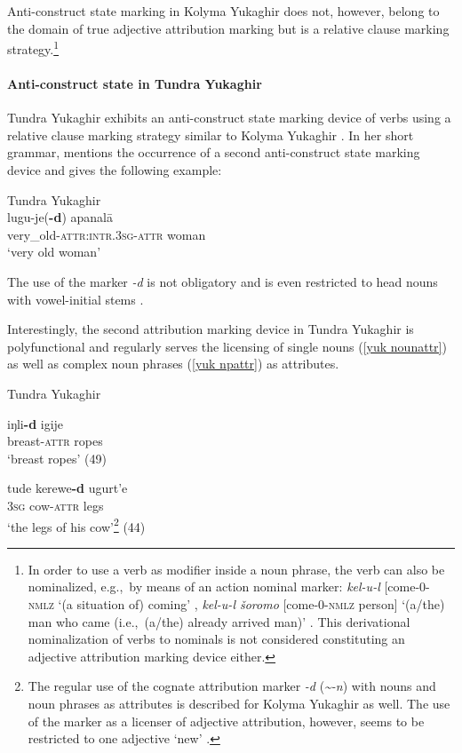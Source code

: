 Anti\hyp{}construct state marking in Kolyma Yukaghir does not, however, belong to the domain of true adjective attribution marking but is a relative clause marking strategy.\footnote{In order to use a verb as modifier inside a noun phrase, the verb can also be nominalized, e.g.,~by means of an action nominal marker: \textit{kel-u-l} [come-0-\textsc{nmlz} ‘(a situation of) coming’ \cite[147]{maslova2003b}, \textit{kel-u-l šoromo} [come-0-\textsc{nmlz} person] ‘(a/the) man who came (i.e.,~(a/the) already arrived man)’ \cite[67]{maslova2003b}. This derivational nominalization of verbs to nominals is not considered constituting an adjective attribution marking device either.}

\paragraph*{Anti\hyp{}construct state in Tundra Yukaghir}
Tundra Yukaghir exhibits an anti\hyp{}construct state marking device of verbs using a relative clause marking strategy similar to Kolyma Yukaghir \citep[49–50, passim]{maslova2003a}. In her short grammar, \cite{maslova2003a} mentions the occurrence of a second anti\hyp{}construct state marking device and gives the following example:
\begin{exe}
\ex 	
\rm{Tundra Yukaghir \citep[50]{maslova2003a}}\\
\gll 	lugu-je(\textbf{-d}) apanalā\\
	very\_old-\textsc{attr:intr.3sg}-\textsc{attr} woman\\
\glt	‘very old woman’
\end{exe}
The use of the marker \textit{-d} is not obligatory and is even restricted to head nouns with vowel-initial stems \cite[50]{maslova2003a}.

Interestingly, the second attribution marking device in Tundra Yukaghir is polyfunctional and regularly serves the licensing of single nouns (\ref{yuk nounattr}) as well as complex noun phrases (\ref{yuk npattr}) as attributes.
\begin{exe}
\ex 
\rm{Tundra Yukaghir \citep{maslova2003a}}
\begin{xlist}
\ex
\label{yuk nounattr}
\gll	iŋli\textbf{-d} igije\\
	breast-\textsc{attr} ropes\\
\glt	‘breast ropes’ (49)

\ex
\label{yuk npattr}
\gll	tude kerewe\textbf{-d} ugurt'e\\
	\textsc{3sg} cow-\textsc{attr} legs\\
\glt	‘the legs of his cow’\footnote{The regular use of the cognate attribution marker \textit{-d} (\textit{\textasciitilde-n}) with nouns and noun phrases as attributes is described for Kolyma Yukaghir as well. The use of the marker as a licenser of adjective attribution, however, seems to be restricted to one adjective ‘new’ \citep[71]{maslova2003b}.} (44)
\end{xlist}
\end{exe}

